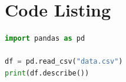 \section{Code Listing}

\begin{lstlisting}[language=Python, caption={Example script}]
import pandas as pd

df = pd.read_csv("data.csv")
print(df.describe())
\end{lstlisting}
